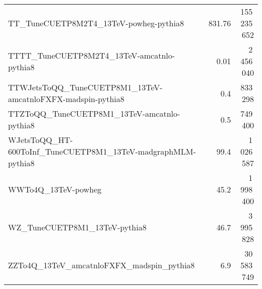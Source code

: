 \begin{center}
{\begin{tabular}{ l r r}
     TT\_TuneCUETP8M2T4\_13TeV-powheg-pythia8                        & 831.76 & 155\,235\,652 \\
     TTTT\_TuneCUETP8M2T4\_13TeV-amcatnlo-pythia8                    &   0.01 &   2\,456\,040 \\
     TTWJetsToQQ\_TuneCUETP8M1\_13TeV-amcatnloFXFX-madspin-pythia8   &   0.4  &      833\,298 \\
     TTZToQQ\_TuneCUETP8M1\_13TeV-amcatnlo-pythia8                   &   0.5  &      749\,400 \\
     WJetsToQQ\_HT-600ToInf\_TuneCUETP8M1\_13TeV-madgraphMLM-pythia8 &  99.4  &   1\,026\,587 \\
     WWTo4Q\_13TeV-powheg                                            &  45.2  &   1\,998\,400 \\
     WZ\_TuneCUETP8M1\_13TeV-pythia8                                 &  46.7  &   3\,995\,828 \\
     ZZTo4Q\_13TeV\_amcatnloFXFX\_madspin\_pythia8                   &   6.9  &  30\,583\,749 \\
     \hline
    \end{tabular}}
  \end{center}
